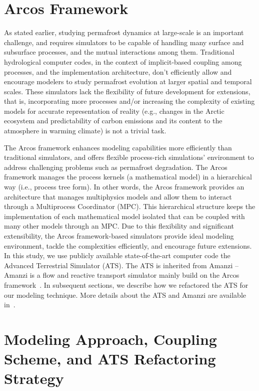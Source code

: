 \documentclass[review]{elsarticle}
\begin{document}
\section{Arcos Framework}\label{arcos-framework}

As stated earlier, studying permafrost dynamics at large-scale is an important challenge, and requires simulators to be capable of handling many surface and subsurface processes, and the mutual interactions among them. Traditional hydrological computer codes, in the context of implicit-based coupling among processes, and the implementation architecture, don't efficiently allow and encourage modelers to study permafrost evolution at larger spatial and temporal scales. These simulators lack the flexibility of future development for extensions, that is, incorporating more processes and/or increasing the complexity of existing models for accurate representation of reality (e.g., changes in the Arctic ecosystem and predictability of carbon emissions and its content to the atmosphere in warming climate) is not a trivial task.

The Arcos framework enhances modeling capabilities more efficiently than traditional simulators, and offers flexible process-rich simulations' environment to address challenging problems such as permafrost degradation. The Arcos framework manages the process kernels (a mathematical model) in a hierarchical way (i.e., process tree form). In other words, the Arcos framework provides an architecture that manages multiphysics models and allow them to interact through a Multiprocess Coordinator (MPC). This hierarchical structure keeps the implementation of each mathematical model isolated that can be coupled with many other models through an MPC. Due to this flexibility and significant extensibility, the Arcos framework-based simulators provide ideal modeling environment, tackle the complexities efficiently, and encourage future extensions. 
In this study, we use publicly available state-of-the-art computer code the Advanced Terrestrial Simulator (ATS). The ATS is inherited from Amanzi -- Amanzi is a flow and reactive transport simulator mainly build on the Arcos framework~\cite{moulton2012high}. In subsequent sections, we describe how we refactored the ATS for our modeling technique. More details about the ATS and Amanzi are available in~\cite{ecoon2016managing, moulton2012high, spainter2016integrated}.


\section{Modeling Approach, Coupling Scheme, and ATS Refactoring Strategy}\label{mixed-dim-model}
\end{document}
